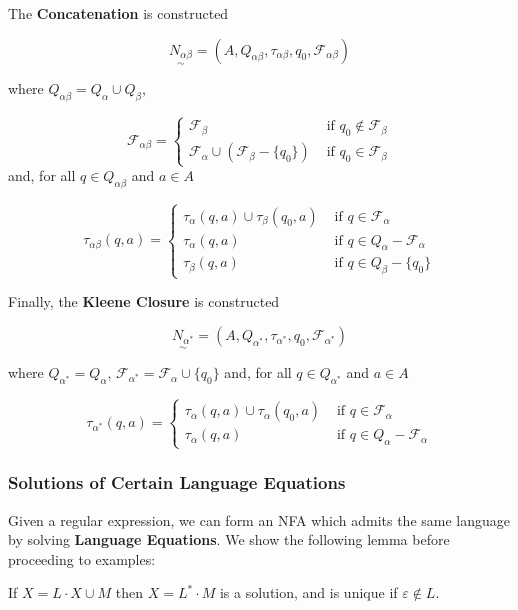 The \textbf{Concatenation} is constructed 

\[\underset{\sim}{N_{\alpha\beta}}=(A, Q_{\alpha\beta}, \tau_{\alpha\beta}, q_0, \mathcal{F}_{\alpha\beta})\] 

where $Q_{\alpha\beta}=Q_{\alpha}\cup Q_{\beta}$,

\[\mathcal{F}_{\alpha\beta}=\begin{cases}\mathcal{F}_{\beta} &\text{ if } q_0\not\in \mathcal{F}_{\beta}\\ \mathcal{F}_{\alpha}\cup(\mathcal{F}_{\beta}-\{q_0\}) &\text{ if } q_0\in \mathcal{F}_{\beta}\end{cases}\] and, for all $q\in Q_{\alpha\beta}$ and $a\in A$

\[\tau_{\alpha\beta}(q, a) = \begin{cases}
      \tau_{\alpha}(q, a)\cup\tau_{\beta}(q_0, a) & \text{ if } q\in\mathcal{F}_{\alpha}\\
      \tau_{\alpha}(q, a) & \text{ if } q\in Q_{\alpha}-\mathcal{F}_{\alpha}\\
      \tau_{\beta}(q, a) & \text{ if } q\in Q_{\beta}-\{q_0\} 
\end{cases}\]

Finally, the \textbf{Kleene Closure} is constructed 

\[\underset{\sim}{N_{\alpha^*}}=(A, Q_{\alpha^*}, \tau_{\alpha^*}, q_0, \mathcal{F}_{\alpha^*})\] 

where $Q_{\alpha^*}=Q_{\alpha}$, $\mathcal{F}_{\alpha^*}=\mathcal{F}_{\alpha}\cup\{q_0\}$ and, for all $q\in Q_{\alpha^*}$ and $a\in A$

\[\tau_{\alpha^*}(q, a) = \begin{cases}
      \tau_{\alpha}(q, a)\cup\tau_{\alpha}(q_0, a) & \text{ if } q\in\mathcal{F}_{\alpha}\\
      \tau_{\alpha}(q, a) & \text{ if } q\in Q_{\alpha}-\mathcal{F}_{\alpha}
\end{cases}\]

\subsubsection{Solutions of Certain Language Equations}

Given a regular expression, we can form an NFA which admits the same language by solving \textbf{Language Equations}. We show the following lemma before proceeding to examples:

\begin{lemma}
      If $X=L\cdot X\cup M$ then $X=L^*\cdot M$ is a solution, and is unique if $\varepsilon\not\in L$. 
\end{lemma}

